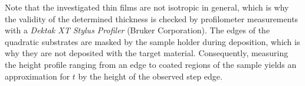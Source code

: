 Note that the investigated thin films are not isotropic in general, which is why the validity of the determined thickness is checked by profilometer measurements with a \textit{Dektak XT Stylus Profiler} (Bruker Corporation).
The edges of the quadratic substrates are masked by the sample holder during deposition, which is why they are not deposited with the target material.
Consequently, measuring the height profile ranging from an edge to coated regions of the sample yields an approximation for $t$ by the height of the observed step edge.

